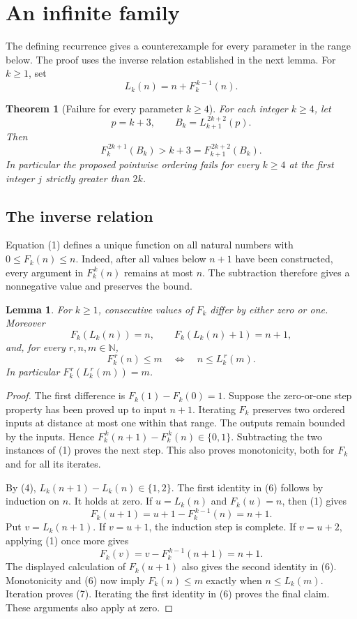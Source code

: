 \documentclass[11pt,a4paper]{article}
\newtheorem{theorem}{Theorem}
\newtheorem{lemma}{Lemma}
\newcommand{\N}{\mathbb N}
\newcommand{\itf}[2]{F_{#1}^{\,#2}}
\newcommand{\itl}[2]{L_{#1}^{\,#2}}
\begin{document}
\section{An infinite family}

The defining recurrence gives a counterexample for every parameter in
the range below. The proof uses the inverse relation established in
the next lemma.
For \(k\ge1\), set
\[
 L_k(n)=n+\itf{k}{k-1}(n).
 \tag{4}
\]

\begin{theorem}[Failure for every parameter \(k\ge4\)]
For each integer \(k\ge4\), let
\[
 p=k+3,\qquad B_k=\itl{k+1}{2k+2}(p).
\]
Then
\[
 \boxed{\itf{k}{2k+1}(B_k)>k+3
      =\itf{k+1}{2k+2}(B_k).}
 \tag{5}
\]
In particular the proposed pointwise ordering fails for every \(k\ge4\)
at the first integer \(j\) strictly greater than \(2k\).
\end{theorem}

\subsection{The inverse relation}

Equation (1) defines a unique function on all natural numbers with
\(0\le F_k(n)\le n\).
Indeed, after all values below \(n+1\) have been constructed, every argument in
\(\itf{k}{k}(n)\) remains at most \(n\).
The subtraction therefore gives a nonnegative value and preserves the bound.

\begin{lemma}
For \(k\ge1\), consecutive values of \(F_k\) differ by either zero or one.
Moreover
\[
 F_k(L_k(n))=n,\qquad F_k(L_k(n)+1)=n+1,
 \tag{6}
\]
and, for every \(r,n,m\in\N\),
\[
 \itf{k}{r}(n)\le m\quad\Longleftrightarrow\quad n\le\itl{k}{r}(m).
 \tag{7}
\]
In particular \(\itf{k}{r}(\itl{k}{r}(m))=m\).
\end{lemma}

\begin{proof}
The first difference is \(F_k(1)-F_k(0)=1\). Suppose the zero-or-one step property
has been proved up to input \(n+1\). Iterating \(F_k\) preserves two ordered
inputs at distance at most one within that range. The outputs remain bounded
by the inputs. Hence
\(\itf{k}{k}(n+1)-\itf{k}{k}(n)\in\{0,1\}\).
Subtracting the two instances of (1) proves the next step. This also proves
monotonicity, both for \(F_k\) and for all its iterates.

By (4), \(L_k(n+1)-L_k(n)\in\{1,2\}\). The first identity in (6) follows
by induction on \(n\). It holds at zero. If \(u=L_k(n)\) and \(F_k(u)=n\),
then (1) gives
\[
 F_k(u+1)=u+1-\itf{k}{k-1}(n)=n+1.
\]
Put \(v=L_k(n+1)\). If \(v=u+1\), the induction step is complete. If
\(v=u+2\), applying (1) once more gives
\[
 F_k(v)=v-\itf{k}{k-1}(n+1)=n+1.
\]
The displayed calculation of \(F_k(u+1)\) also gives the second identity in (6).
Monotonicity and (6) now imply
\(F_k(n)\le m\) exactly when \(n\le L_k(m)\).
Iteration proves (7). Iterating the first identity in (6) proves the final
claim. These arguments also apply at zero.
\end{proof}
\end{document}
